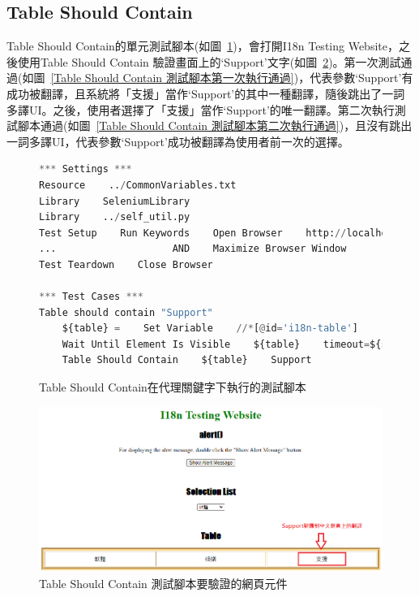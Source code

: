 \subsection{Table Should Contain}
Table Should Contain的單元測試腳本(如圖~\ref{Table Should Contain在代理關鍵字下執行的測試腳本})，會打開I18n Testing Website，之後使用Table Should Contain 驗證畫面上的‘Support’文字(如圖~\ref{Table Should Contain 測試腳本要驗證的網頁元件})。第一次測試通過(如圖~\ref{Table Should Contain 測試腳本第一次執行通過})，代表參數‘Support’有成功被翻譯，且系統將「支援」當作‘Support’的其中一種翻譯，隨後跳出了一詞多譯UI。之後，使用者選擇了「支援」當作‘Support’的唯一翻譯。第二次執行測試腳本通過(如圖~\ref{Table Should Contain 測試腳本第二次執行通過})，且沒有跳出一詞多譯UI，代表參數‘Support’成功被翻譯為使用者前一次的選擇。
\hspace*{\fill} \\
\begin{figure}[H]
\begin{lstlisting}[language={python}]
*** Settings ***
Resource    ../CommonVariables.txt
Library    SeleniumLibrary
Library    ../self_util.py
Test Setup    Run Keywords    Open Browser    http://localhost:3000    Chrome
...                    AND    Maximize Browser Window
Test Teardown    Close Browser

*** Test Cases ***
Table should contain "Support"
    ${table} =    Set Variable    //*[@id='i18n-table']
    Wait Until Element Is Visible    ${table}    timeout=${shortPeriodOfTime}
    Table Should Contain    ${table}    Support
\end{lstlisting}
\caption{Table Should Contain在代理關鍵字下執行的測試腳本}
\label{Table Should Contain在代理關鍵字下執行的測試腳本}
\end{figure}

\begin{figure}[H]
\includegraphics[width= \textwidth]{../論文截圖/4-1-13 Table should contain要驗證的網頁元件.png}
\caption{Table Should Contain 測試腳本要驗證的網頁元件}
\label{Table Should Contain 測試腳本要驗證的網頁元件}
\end{figure}

